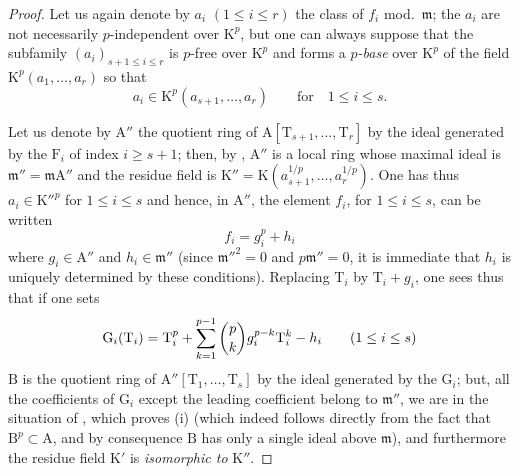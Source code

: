 \begin{proof}
Let us again denote by $a_i$ $(1\leq i\leq r)$ the class of $f_i$ mod.~$\mathfrak{m}$; the $a_i$ are not necessarily $p$-independent over $\mathrm{K}^p$, but one can always suppose that the subfamily
$(a_i)_{s+1\leq i\leq r}$ is $p$-free over $\mathrm{K}^p$ and forms a \emph{$p$-base} over $\mathrm{K}^p$ of the field $\mathrm{K}^p(a_1,\ldots,a_r)$ so that
\[
  a_i\in\mathrm{K}^p(a_{s+1},\ldots,a_r)\qquad\text{for}\quad 1\leq i\leq s.
\]

Let us denote by $\mathrm{A}''$ the quotient ring of $\mathrm{A}[\mathrm{T}_{s+1},\ldots,\mathrm{T}_r]$ by the ideal generated by the $\mathrm{F}_i$ of index $i\geq s+1$; then, by , $\mathrm{A}''$ is a local ring whose maximal ideal is $\mathfrak{m}''=\mathfrak{m}\mathrm{A}''$ and the residue field is $\mathrm{K}''=\mathrm{K}(a_{s+1}^{1/p},\ldots,a_r^{1/p})$.
One has thus $a_i\in\mathrm{K}''^p$ for $1\leq i\leq s$ and hence, in $\mathrm{A}''$, the element $f_i$, for $1\leq i\leq s$, can be written
\[
\label{0.22.4.7.3}
  f_i=g_i^p+h_i
  \tag{22.4.7.3}
\]
where $g_i\in\mathrm{A}''$ and $h_i\in\mathfrak{m}''$ (since $\mathfrak{m}''^2=0$ and $p\mathfrak{m}''=0$, it is immediate that $h_i$ is uniquely determined by these conditions).
Replacing $\mathrm{T}_i$ by $\mathrm{T}_i+g_i$, one sees thus that if one sets
\[
  \mathrm{G}_i(\mathrm{T}_i)=\mathrm{T}_i^p+\sum_{k=1}^{p-1}\binom{p}{k}g_i^{p-k}\mathrm{T}_i^k- h_i\qquad(1\leq i\leq s)
\]
$\mathrm{B}$ is the quotient ring of $\mathrm{A}''[\mathrm{T}_1,\ldots,\mathrm{T}_s]$ by the ideal generated by the $\mathrm{G}_i$; but, all the coefficients of $\mathrm{G}_i$ except the leading coefficient belong to $\mathfrak{m}''$, we are in the situation of , which proves (i) (which indeed follows directly from the fact that $\mathrm{B}^p\subset\mathrm{A}$, and by consequence $\mathrm{B}$ has only a single ideal above $\mathfrak{m}$), and furthermore the residue field $\mathrm{K}'$ is \emph{isomorphic to} $\mathrm{K}''$.


\end{proof}
